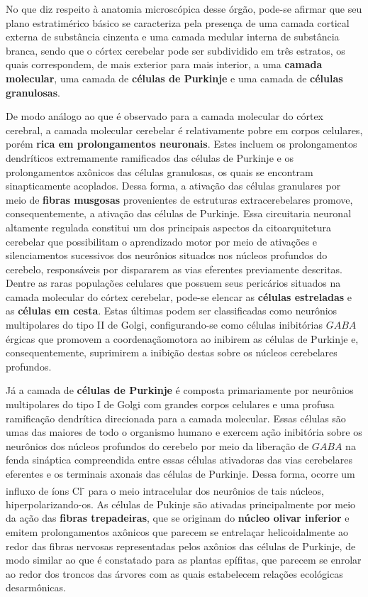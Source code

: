 \documentclass[
]{book}
\begin{document}
No que diz respeito à anatomia microscópica desse órgão, pode-se afirmar que seu plano estratimérico básico se caracteriza pela presença de uma camada cortical externa de substância cinzenta e uma camada medular interna de substância branca, sendo que o córtex cerebelar pode ser subdividido em três estratos, os quais correspondem, de mais exterior para mais interior, a uma \textbf{camada molecular}, uma camada de \textbf{células de Purkinje} e uma camada de \textbf{células granulosas}.

De modo análogo ao que é observado para a camada molecular do córtex cerebral, a camada molecular cerebelar é relativamente pobre em corpos celulares, porém \textbf{rica em prolongamentos neuronais}. Estes incluem os prolongamentos dendríticos extremamente ramificados das células de Purkinje e os prolongamentos axônicos das células granulosas, os quais se encontram sinapticamente acoplados. Dessa forma, a ativação das células granulares por meio de \textbf{fibras musgosas} provenientes de estruturas extracerebelares promove, consequentemente, a ativação das células de Purkinje. Essa circuitaria neuronal altamente regulada constitui um dos principais aspectos da citoarquitetura cerebelar que possibilitam o aprendizado motor por meio de ativações e silenciamentos sucessivos dos neurônios situados nos núcleos profundos do cerebelo, responsáveis por dispararem as vias eferentes previamente descritas. Dentre as raras populações celulares que possuem seus pericários situados na camada molecular do córtex cerebelar, pode-se elencar as \textbf{células estreladas} e as \textbf{células em cesta}. Estas últimas podem ser classificadas como neurônios multipolares do tipo II de Golgi, configurando-se como células inibitórias \(GABA\)érgicas que promovem a coordenaçãomotora ao inibirem as células de Purkinje e, consequentemente, suprimirem a inibição destas sobre os núcleos cerebelares profundos.

Já a camada de \textbf{células de Purkinje} é composta primariamente por neurônios multipolares do tipo I de Golgi com grandes corpos celulares e uma profusa ramificação dendrítica direcionada para a camada molecular. Essas células são umas das maiores de todo o organismo humano e exercem ação inibitória sobre os neurônios dos núcleos profundos do cerebelo por meio da liberação de \(GABA\) na fenda sináptica compreendida entre essas células ativadoras das vias cerebelares eferentes e os terminais axonais das células de Purkinje. Dessa forma, ocorre um influxo de íons Cl\textsuperscript{-} para o meio intracelular dos neurônios de tais núcleos, hiperpolarizando-os. As células de Pukinje são ativadas principalmente por meio da ação das \textbf{fibras trepadeiras}, que se originam do \textbf{núcleo olivar inferior} e emitem prolongamentos axônicos que parecem se entrelaçar helicoidalmente ao redor das fibras nervosas representadas pelos axônios das células de Purkinje, de modo similar ao que é constatado para as plantas epífitas, que parecem se enrolar ao redor dos troncos das árvores com as quais estabelecem relações ecológicas desarmônicas.
\end{document}
